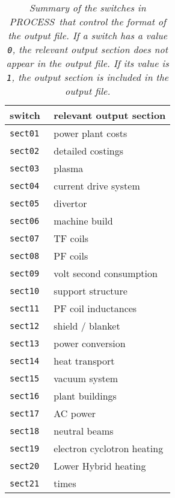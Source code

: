 \documentclass[11pt,a4paper]{report}
\newcommand{\PS}{\mbox{\it PROCESS\/ }}
\begin{document}

\begin{table}[ht]
\begin{center}

\begin{tabular}{||l|l||} \hline
switch      & relevant output section    \\ \hline
\tt sect01  & power plant   costs        \\
\tt sect02  & detailed costings          \\
\tt sect03  & plasma                     \\
\tt sect04  & current drive system       \\
\tt sect05  & divertor                   \\
\tt sect06  & machine build              \\
\tt sect07  & TF coils                   \\
\tt sect08  & PF coils                   \\
\tt sect09  & volt second consumption    \\
\tt sect10  & support structure          \\
\tt sect11  & PF coil inductances        \\
\tt sect12  & shield / blanket           \\
\tt sect13  & power conversion           \\
\tt sect14  & heat transport             \\
\tt sect15  & vacuum system              \\
\tt sect16  & plant buildings            \\
\tt sect17  & AC power                   \\
\tt sect18  & neutral beams              \\
\tt sect19  & electron cyclotron heating \\
\tt sect20  & Lower Hybrid heating       \\ 
\tt sect21  & times                      \\ \hline
\end{tabular}
\end{center}
\caption[TABLE_OSECT]{{\it
Summary of the switches in \PS that control the format of the output
file. If a switch has a value {\tt 0}, the relevant output section
does not appear in the output file. If its value is {\tt 1}, the
output section is included in the output file.
}}
\label{tab:osections}
\end{table}
\end{document}
